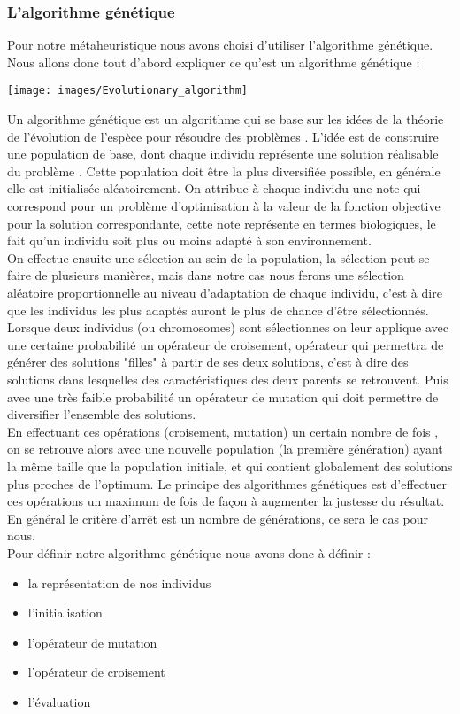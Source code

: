 \documentclass[a4paper]{report}
\begin{document}
\subsubsection{L'algorithme génétique}
Pour notre métaheuristique nous avons choisi d'utiliser l'algorithme génétique. Nous allons donc tout d'abord expliquer ce qu'est un algorithme génétique :\\
\begin{center}
\texttt{[image: images/Evolutionary\_algorithm]}

\end{center}
Un algorithme génétique est un algorithme qui se base sur les idées de la 
théorie de l'évolution de l'espèce pour résoudre des problèmes . L'idée est de construire une population de base, dont chaque individu représente une solution réalisable du problème . Cette population doit être la plus diversifiée possible, en générale elle est initialisée aléatoirement. On attribue à chaque individu une note qui correspond  pour un problème d'optimisation à la valeur de la fonction objective pour la solution correspondante, cette note représente en termes biologiques, le fait qu'un individu soit plus ou moins adapté à son environnement.\\
On effectue ensuite une sélection au sein de la population, la sélection peut se faire de plusieurs manières, mais dans notre cas nous ferons une sélection aléatoire proportionnelle au niveau d'adaptation de chaque individu, c'est à dire que les individus les plus adaptés auront le plus de chance d'être sélectionnés.  Lorsque deux individus (ou chromosomes) sont sélectionnes on leur applique avec une certaine probabilité un opérateur de croisement, opérateur qui permettra de générer des solutions "filles" à partir de ses deux solutions, c'est à dire des solutions dans lesquelles des caractéristiques des deux parents se retrouvent. Puis avec une très faible probabilité un opérateur de mutation qui doit permettre de diversifier l'ensemble des solutions.\\
En effectuant ces opérations (croisement, mutation) un certain nombre de fois , on se retrouve alors avec une nouvelle population (la première génération) ayant la même taille que la population initiale, et qui contient globalement des solutions plus proches de l'optimum. Le principe des algorithmes génétiques est d'effectuer ces opérations un maximum de fois de façon à augmenter la justesse du résultat. En général le critère d'arrêt est un nombre de générations, ce sera le cas pour nous.\\
Pour définir notre algorithme génétique nous avons donc à définir : \\
\begin{itemize}
\item la représentation de nos individus
\item l'initialisation
\item l'opérateur de mutation
\item l'opérateur de croisement
\item l'évaluation
\end{itemize}
\end{document}

